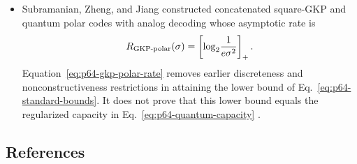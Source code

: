 \begin{itemize}
  \item Subramanian, Zheng, and Jiang constructed concatenated square-GKP and
  quantum polar codes with analog decoding whose asymptotic rate is
  \begin{equation}
    R_{\rm GKP\text{-}polar}(\sigma)
    =\left[\log_2\!\frac{1}{e\sigma^2}\right]_+.
    \label{eq:p64-gkp-polar-rate}
  \end{equation}
  Equation~\eqref{eq:p64-gkp-polar-rate} removes earlier discreteness and
  nonconstructiveness restrictions in attaining the lower bound of
  Eq.~\eqref{eq:p64-standard-bounds}.  It does not prove that this lower bound
  equals the regularized capacity in Eq.~\eqref{eq:p64-quantum-capacity}
  .
\end{itemize}

\subsection*{References}

